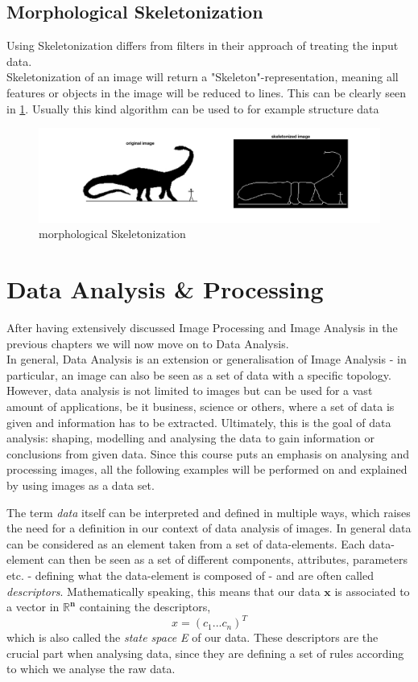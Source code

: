 \subsection{Morphological Skeletonization}
Using Skeletonization  differs from filters in their approach of treating the input data.\\
Skeletonization of an image will return a "Skeleton"-representation, meaning all features or objects in the image will be reduced to lines. This can be clearly seen in \cref{fig:skelet}. Usually this kind algorithm can be used to for example structure data
\begin{figure}[h!]
	\centering
	\includegraphics[width=\textwidth]{images/morphSkelet.png}
	\caption{morphological Skeletonization}
	\label{fig:skelet}
\end{figure}



\section{Data Analysis \& Processing}
After having extensively discussed Image Processing and Image Analysis in the previous chapters we will now move on to Data Analysis. \\In general, Data Analysis is an extension or generalisation of Image Analysis - in particular, an image can also be seen as a set of data with a specific topology. However, data analysis is not limited to images but can be used for a vast amount of applications, be it business, science or others, where a set of data is given and information has to be extracted. Ultimately, this is the goal of data analysis: shaping, modelling and analysing the data to gain information or conclusions from given data.
Since this course puts an emphasis on analysing and processing images, all the following examples will be performed on and explained by using images as a data set.

The term \textit{data} itself can be interpreted and defined in multiple ways, which raises the need for a definition in our context of data analysis of images.
In general data can be considered as an element taken from a set of data-elements. Each data-element can then be seen as a set of different components, attributes, parameters etc. - defining what the data-element is composed of - and are often called \textit{descriptors}. Mathematically speaking, this means that our data $\boldsymbol{x}$ is associated to a vector in $\boldsymbol{\mathbb{R}^n}$ containing the descriptors,
\begin{equation*}
	x = (c_1 ... c_n)^T
\end{equation*}
which is also called the \textit{state space E} of our data.
These descriptors are the crucial part when analysing data, since they are defining a set of rules according to which we analyse the raw data.

